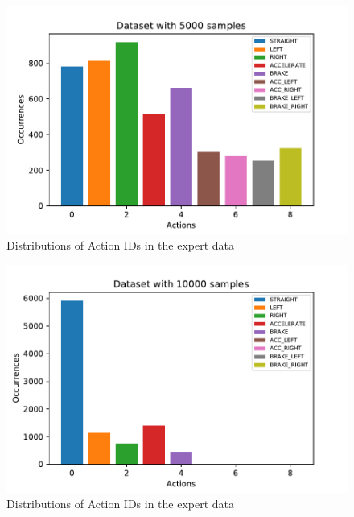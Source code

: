 \documentclass[
        a4paper,
        10pt,
        parskip = full,    %
    ]{scrartcl}
\begin{document}
\begin{figure}[H]
  \begin{center}
    \includegraphics{../images/action_distribution_5000.pdf}
    \caption{Distributions of Action IDs in the expert data}
    \label{dist_5000}
  \end{center}
\end{figure}

\begin{figure}[H]
  \begin{center}
    \includegraphics{../images/action_distribution_10000.pdf}
    \caption{Distributions of Action IDs in the expert data}
    \label{dist_10000}
  \end{center}
\end{figure}
\end{document}
